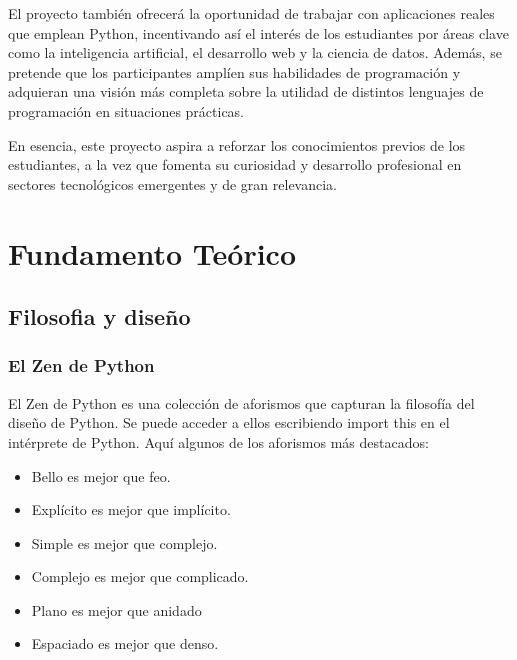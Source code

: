 \documentclass[10pt,a4paper]{article}
\begin{document}
El proyecto también ofrecerá la oportunidad de trabajar con aplicaciones reales que emplean Python, incentivando así el interés de los estudiantes por áreas clave como la inteligencia artificial, el desarrollo web y la ciencia de datos. Además, se pretende que los participantes amplíen sus habilidades de programación y adquieran una visión más completa sobre la utilidad de distintos lenguajes de programación en situaciones prácticas.

En esencia, este proyecto aspira a reforzar los conocimientos previos de los estudiantes, a la vez que fomenta su curiosidad y desarrollo profesional en sectores tecnológicos emergentes y de gran relevancia.
\section{Fundamento Te\'orico}
\subsection{Filosofia y diseño}
    \subsubsection{El Zen de Python}
El Zen de Python es una colección de aforismos que capturan la filosofía del diseño de Python. Se puede acceder a ellos escribiendo import this en el intérprete de Python. Aquí algunos de los aforismos más destacados:
\begin{itemize}
    \item Bello es mejor que feo.
    \item Explícito es mejor que implícito.
    \item Simple es mejor que complejo.
    \item Complejo es mejor que complicado.
    \item Plano es mejor que anidado
    \item Espaciado es mejor que denso.
\end{itemize}
\end{document}
